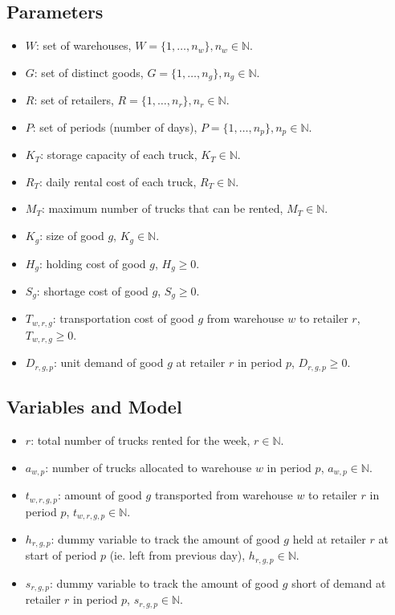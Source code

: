 \documentclass[a4paper,12pt]{article}
\begin{document}
\subsection{Parameters}\label{subsec:parameters}
\begin{itemize}
    \item $W$: set of warehouses, $W = \{1, \hdots, n_w\}, n_w\in \mathbb{N}$.
    \item $G$: set of distinct goods, $G = \{1, \hdots, n_g\}, n_g \in \mathbb{N}$.
    \item $R$: set of retailers, $R = \{1, \hdots, n_r\}, n_r \in \mathbb{N}$.
    \item $P$: set of periods (number of days), $P = \{1, \hdots, n_p\}, n_p \in \mathbb{N}$.
    \item $K_T$: storage capacity of each truck, $K_T \in \mathbb{N}$.
    \item $R_T$: daily rental cost of each truck, $R_T \in \mathbb{N}$.
    \item $M_T$: maximum number of trucks that can be rented, $M_T \in \mathbb{N}$.
    \item $K_g$: size of good $g$, $K_g \in \mathbb{N}$.
    \item $H_g$: holding cost of good $g$, $H_g \geq 0$.
    \item $S_g$: shortage cost of good $g$, $S_g \geq 0$.
    \item $T_{w,r,g}$: transportation cost of good $g$ from warehouse $w$ to retailer $r$, $T_{w,r,g} \geq 0$.
    \item $D_{r,g,p}$: unit demand of good $g$ at retailer $r$ in period $p$, $D_{r,g,p} \geq 0$.
\end{itemize}

\subsection{Variables and Model}\label{subsec:variables-and-model}
\begin{itemize}
    \item $r$: total number of trucks rented for the week, $r \in \mathbb{N}$.
    \item $a_{w,p}$: number of trucks allocated to warehouse $w$ in period $p$, $a_{w,p} \in \mathbb{N}$.
    \item $t_{w,r,g,p}$: amount of good $g$ transported from warehouse $w$ to retailer $r$ in period $p$, $t_{w,r,g,p} \in \mathbb{N}$.
    \item $h_{r,g,p}$: dummy variable to track the amount of good $g$ held at retailer $r$ at start of period $p$ (ie. left from previous day), $h_{r,g,p} \in \mathbb{N}$.
    \item $s_{r,g,p}$: dummy variable to track the amount of good $g$ short of demand at retailer $r$ in period $p$, $s_{r,g,p} \in \mathbb{N}$.
\end{itemize}
\end{document}
